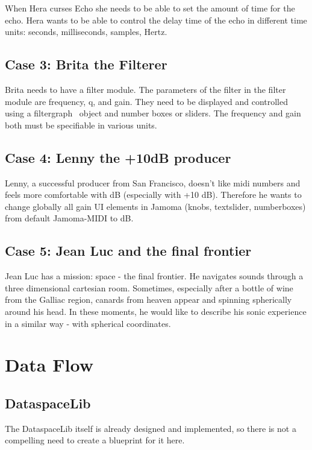 \documentclass[]{article}
\begin{document}
When Hera curses Echo she needs to be able to set the amount of time for the echo.  Hera wants to be able to control the delay time of the echo in different time units: seconds, milliseconds, samples, Hertz.


\subsection{Case 3: Brita the Filterer}

Brita needs to have a filter module.  The parameters of the filter in the filter module are frequency, q, and gain.  They need to be displayed and controlled using a filtergraph~ object and number boxes or sliders.  The frequency and gain both must be specifiable in various units.

\subsection{Case 4: Lenny the +10dB producer}
Lenny, a successful producer from San Francisco, doesn't like midi numbers and feels more comfortable with dB (especially with +10 dB). Therefore he wants to change globally all gain UI elements in Jamoma  (knobs, textslider, numberboxes) from default Jamoma-MIDI to dB. 

\subsection{Case 5: Jean Luc and the final frontier}
Jean Luc has a mission: space - the final frontier. He navigates sounds through a three dimensional cartesian room. Sometimes, especially after a bottle of wine from the Galliac region, canards from heaven appear and spinning spherically around his head. In these moments, he would like to describe his sonic experience in a similar way - with spherical coordinates. 


\section{Data Flow}

\subsection{DataspaceLib}

The DataspaceLib itself is already designed and implemented, so there is not a compelling need to create a blueprint for it here.
\end{document}
